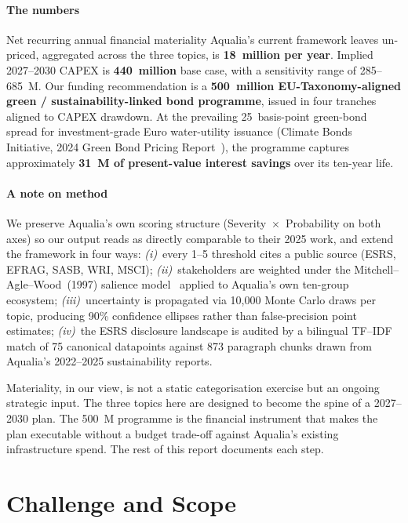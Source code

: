 \documentclass[11pt, a4paper]{article}
\newcommand{\euro}{\texteuro}
\newcommand{\sig}[1]{\textbf{#1}}
\begin{document}
\paragraph{The numbers}
Net recurring annual financial materiality Aqualia's current framework leaves un-priced, aggregated across the three topics, is \sig{\euro{}18~million per year}. Implied 2027--2030 CAPEX is \sig{\euro{}440~million} base case, with a sensitivity range of \euro{}285--685~M. Our funding recommendation is a \sig{\euro{}500~million EU-Taxonomy-aligned green / sustainability-linked bond programme}, issued in four tranches aligned to CAPEX drawdown. At the prevailing 25~basis-point green-bond spread for investment-grade Euro water-utility issuance (Climate Bonds Initiative, 2024 Green Bond Pricing Report~\cite{cbi2024}), the programme captures approximately \sig{\euro{}31~M of present-value interest savings} over its ten-year life.

\paragraph{A note on method}
We preserve Aqualia's own scoring structure (Severity~$\times$~Probability on both axes) so our output reads as directly comparable to their 2025 work, and extend the framework in four ways: \emph{(i)}~every 1--5 threshold cites a public source (ESRS, EFRAG, SASB, WRI, MSCI); \emph{(ii)}~stakeholders are weighted under the Mitchell--Agle--Wood~(1997) salience model~\cite{mitchell1997} applied to Aqualia's own ten-group ecosystem; \emph{(iii)}~uncertainty is propagated via 10{,}000 Monte Carlo draws per topic, producing 90\% confidence ellipses rather than false-precision point estimates; \emph{(iv)}~the ESRS disclosure landscape is audited by a bilingual TF--IDF match of 75 canonical datapoints against 873 paragraph chunks drawn from Aqualia's 2022--2025 sustainability reports.

Materiality, in our view, is not a static categorisation exercise but an ongoing strategic input. The three topics here are designed to become the spine of a 2027--2030 plan. The \euro{}500~M programme is the financial instrument that makes the plan executable without a budget trade-off against Aqualia's existing infrastructure spend. The rest of this report documents each step.

\section{Challenge and Scope}
\label{sec:challenge}
\end{document}
